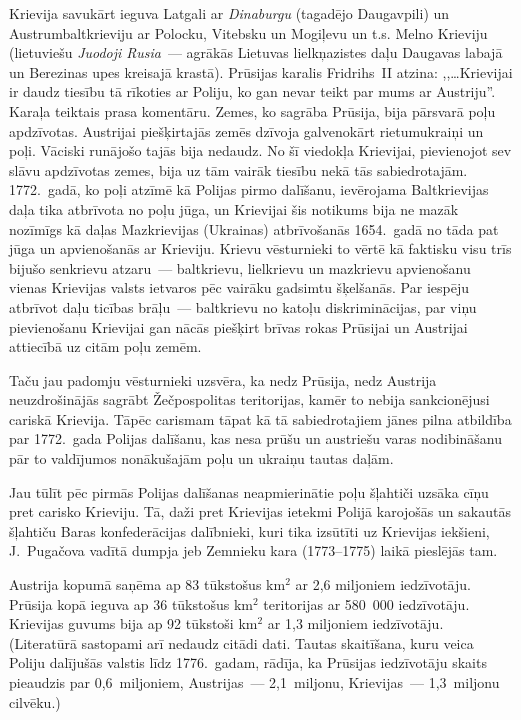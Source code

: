 \documentclass[twoside,a5paper,12pt,fleqn,openany]{extbook}
\newcommand{\lttxti}[1]{\textit{\textlithuanian{#1}}}
\begin{document}
Krievija savukārt ieguva Latgali ar \lttxti{Dinaburgu} (tagadējo Daugavpili) un Austrumbaltkrieviju ar Polocku, Vitebsku un Mogiļevu un t.s. Melno Krieviju (lietuviešu \lttxti{Juodoji Rusia}~--- agrākās Lietuvas lielkņazistes daļu Daugavas labajā un Berezinas upes kreisajā krastā). Prūsijas karalis Fridrihs~II atzina: ,,\dots{}Krievijai ir daudz tiesību tā rīkoties ar Poliju, ko gan nevar teikt par mums ar Austriju''. Karaļa teiktais prasa komentāru. Zemes, ko sagrāba Prūsija, bija pārsvarā poļu apdzīvotas. Austrijai piešķirtajās zemēs dzīvoja galvenokārt rietumukraiņi un poļi. Vāciski runājošo tajās bija nedaudz. No šī viedokļa Krievijai, pievienojot sev slāvu apdzīvotas zemes, bija uz tām vairāk tiesību nekā tās sabiedrotajām. 1772.~gadā, ko poļi atzīmē kā Polijas pirmo dalīšanu, ievērojama Baltkrievijas daļa tika atbrīvota no poļu jūga, un Krievijai šis notikums bija ne mazāk nozīmīgs kā daļas Mazkrievijas (Ukrainas) atbrīvošanās 1654.~gadā no tāda pat jūga un apvienošanās ar Krieviju. Krievu vēsturnieki to vērtē kā faktisku visu trīs bijušo senkrievu atzaru~--- baltkrievu, lielkrievu un mazkrievu apvienošanu vienas Krievijas valsts ietvaros pēc vairāku gadsimtu šķelšanās. Par iespēju atbrīvot daļu ticības brāļu~--- baltkrievu no katoļu diskriminācijas, par viņu pievienošanu Krievijai gan nācās piešķirt brīvas rokas Prūsijai un Austrijai attiecībā uz citām poļu zemēm.

Taču jau padomju vēsturnieki uzsvēra, ka nedz Prūsija, nedz Austrija neuzdrošinājās sagrābt Žečpospolitas teritorijas, kamēr to nebija sankcionējusi cariskā Krievija. Tāpēc carismam tāpat kā tā sabiedrotajiem jānes pilna atbildība par 1772.~gada Polijas dalīšanu, kas nesa prūšu un austriešu varas nodibināšanu pār to valdījumos nonākušajām poļu un ukraiņu tautas daļām.

Jau tūlīt pēc pirmās Polijas dalīšanas neapmierinātie poļu šļahtiči uzsāka cīņu pret carisko Krieviju. Tā, daži pret Krievijas ietekmi Polijā karojošās un sakautās šļahtiču Baras konfederācijas dalībnieki, kuri tika izsūtīti uz Krievijas iekšieni, J.~Pugačova vadītā dumpja jeb Zemnieku kara (1773--1775) laikā pieslējās tam.

Austrija kopumā saņēma ap 83 tūkstošus km$^{2}$ ar 2,6 miljoniem iedzīvotāju. Prūsija kopā ieguva ap 36 tūkstošus km$^{2}$ teritorijas ar 580~000 iedzīvotāju. Krievijas guvums bija ap 92 tūkstoši km$^{2}$ ar 1,3 miljoniem iedzīvotāju. (Literatūrā sastopami arī nedaudz citādi dati. Tautas skaitīšana, kuru veica Poliju dalījušās valstis līdz 1776.~gadam, rādīja, ka Prūsijas iedzīvotāju skaits pieaudzis par 0,6~miljoniem, Austrijas~--- 2,1~miljonu, Krievijas~--- 1,3~miljonu cilvēku.)
\end{document}
